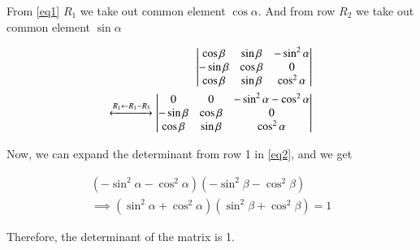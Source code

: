 \documentclass[journal,12pt,twocolumn]{IEEEtran}
\begin{document}
From \ref{eq1} $R_1$ we take out common element $\cos\alpha$. 
And from row $R_2$ we take out common element $\sin\alpha$

\begin{align}\label{eq2}
	\begin{vmatrix}
		\cos\beta & \sin\beta & -\sin^{2}\alpha\\ 
		-\sin\beta & \cos\beta & 0 \\ 
		\cos\beta & \sin\beta & \cos^{2}\alpha
	\end{vmatrix}\nonumber\\
	\xleftrightarrow[]{R_1 \leftarrow R_1 - R_3}	
	\begin{vmatrix}
		0 & 0 & -\sin^{2}\alpha - \cos^{2}\alpha\\ 
		-\sin\beta & \cos\beta & 0 \\ 
		\cos\beta & \sin\beta & \cos^{2}\alpha
	\end{vmatrix}
\end{align}

Now, we can expand the determinant from row 1 in \ref{eq2}, and we get

\begin{align}
	\left(-\sin^{2}\alpha - \cos^{2}\alpha\right) \left(-\sin^{2}\beta - \cos^{2}\beta\right)\nonumber \\
	\implies \left(\sin^{2}\alpha + \cos^{2}\alpha\right) \left(\sin^{2}\beta + \cos^{2}\beta\right) = 1
\end{align}

    Therefore, the determinant of the matrix is 1.
\end{document}
